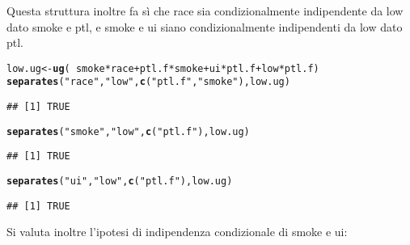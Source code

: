 \documentclass{article}\usepackage[]{graphicx}\usepackage[]{color}
\makeatletter
\newcommand{\hlstr}[1]{\textcolor[rgb]{0.192,0.494,0.8}{#1}}%
\newcommand{\hlopt}[1]{\textcolor[rgb]{0,0,0}{#1}}%
\newcommand{\hlstd}[1]{\textcolor[rgb]{0.345,0.345,0.345}{#1}}%
\newcommand{\hlkwb}[1]{\textcolor[rgb]{0.69,0.353,0.396}{#1}}%
\newcommand{\hlkwd}[1]{\textcolor[rgb]{0.737,0.353,0.396}{\textbf{#1}}}%
\newenvironment{kframe}{%
 \def\at@end@of@kframe{}%
 \ifinner\ifhmode%
  \def\at@end@of@kframe{\end{minipage}}%
  \begin{minipage}{\columnwidth}%
 \fi\fi%
 \def\FrameCommand##1{\hskip\@totalleftmargin \hskip-\fboxsep
 \colorbox{shadecolor}{##1}\hskip-\fboxsep
     \hskip-\linewidth \hskip-\@totalleftmargin \hskip\columnwidth}%
 \MakeFramed {\advance\hsize-\width
   \@totalleftmargin\z@ \linewidth\hsize
   \@setminipage}}%
 {\par\unskip\endMakeFramed%
 \at@end@of@kframe}
\newenvironment{knitrout}{}{} %
\makeatother
\begin{document}
Questa struttura inoltre fa sì che race sia condizionalmente indipendente da low dato smoke e ptl, e smoke e ui siano condizionalmente indipendenti da low dato ptl.
\begin{knitrout}
\color{fgcolor}\begin{kframe}
\begin{alltt}
\hlstd{low.ug} \hlkwb{<-} \hlkwd{ug}\hlstd{(}\hlopt{~}\hlstd{smoke}\hlopt{*}\hlstd{race} \hlopt{+} \hlstd{ptl.f}\hlopt{*}\hlstd{smoke} \hlopt{+} \hlstd{ui}\hlopt{*}\hlstd{ptl.f} \hlopt{+} \hlstd{low}\hlopt{*}\hlstd{ptl.f)}
\hlkwd{separates}\hlstd{(}\hlstr{"race"}\hlstd{,}\hlstr{"low"}\hlstd{,}\hlkwd{c}\hlstd{(}\hlstr{"ptl.f"}\hlstd{,}\hlstr{"smoke"}\hlstd{),low.ug)}
\end{alltt}
\begin{verbatim}
## [1] TRUE
\end{verbatim}
\begin{alltt}
\hlkwd{separates}\hlstd{(}\hlstr{"smoke"}\hlstd{,}\hlstr{"low"}\hlstd{,}\hlkwd{c}\hlstd{(}\hlstr{"ptl.f"}\hlstd{),low.ug)}
\end{alltt}
\begin{verbatim}
## [1] TRUE
\end{verbatim}
\begin{alltt}
\hlkwd{separates}\hlstd{(}\hlstr{"ui"}\hlstd{,}\hlstr{"low"}\hlstd{,}\hlkwd{c}\hlstd{(}\hlstr{"ptl.f"}\hlstd{),low.ug)}
\end{alltt}
\begin{verbatim}
## [1] TRUE
\end{verbatim}
\end{kframe}
\end{knitrout}

Si valuta inoltre l'ipotesi di indipendenza condizionale di smoke e ui: 
\end{document}
